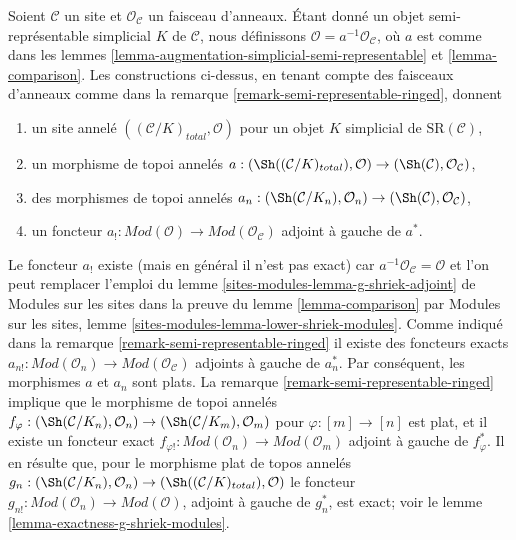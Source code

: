 \begin{remark}
\label{remark-augmentation-ringed}
Soient $\mathcal{C}$ un site et $\mathcal{O}_\mathcal{C}$ un faisceau d'anneaux.
Étant donné un objet semi-représentable simplicial $K$ de $\mathcal{C}$,
nous définissons $\mathcal{O} = a^{-1}\mathcal{O}_\mathcal{C}$, où $a$
est comme dans les lemmes \ref{lemma-augmentation-simplicial-semi-representable} et
\ref{lemma-comparison}.
Les constructions ci-dessus, en tenant compte des faisceaux d'anneaux
comme dans la remarque \ref{remark-semi-representable-ringed}, donnent
\begin{enumerate}
\item un site annelé $((\mathcal{C}/K)_{total}, \mathcal{O})$
pour un objet $K$ simplicial de $\text{SR}(\mathcal{C})$,
\item un morphisme de topoi annelés
$a : (\Sh((\mathcal{C}/K)_{total}), \mathcal{O}) \to
(\Sh(\mathcal{C}), \mathcal{O}_\mathcal{C})$,
\item des morphismes de topoi annelés
$a_n : (\Sh(\mathcal{C}/K_n), \mathcal{O}_n) \to
(\Sh(\mathcal{C}), \mathcal{O}_\mathcal{C})$,
\item un foncteur
$a_! : \textit{Mod}(\mathcal{O}) \to \textit{Mod}(\mathcal{O}_\mathcal{C})$
adjoint à gauche de $a^*$.
\end{enumerate}
Le foncteur $a_!$ existe (mais en général il n'est pas exact)
car $a^{-1}\mathcal{O}_\mathcal{C} = \mathcal{O}$
et l'on peut remplacer l'emploi du
lemme \ref{sites-modules-lemma-g-shriek-adjoint} de Modules sur les sites
dans la preuve du lemme \ref{lemma-comparison}
par Modules sur les sites, lemme \ref{sites-modules-lemma-lower-shriek-modules}.
Comme indiqué dans la remarque \ref{remark-semi-representable-ringed}
il existe des foncteurs exacts
$a_{n!} : \textit{Mod}(\mathcal{O}_n) \to
\textit{Mod}(\mathcal{O}_\mathcal{C})$
adjoints à gauche de $a_n^*$. Par conséquent, les morphismes $a$ et $a_n$ sont plats.
La remarque \ref{remark-semi-representable-ringed}
implique que le morphisme de topoi annelés
$f_\varphi : (\Sh(\mathcal{C}/K_n), \mathcal{O}_n) \to
(\Sh(\mathcal{C}/K_m), \mathcal{O}_m)$
pour $\varphi : [m] \to [n]$ est plat, et il existe un foncteur exact
$f_{\varphi !} : \textit{Mod}(\mathcal{O}_n) \to \textit{Mod}(\mathcal{O}_m)$
adjoint à gauche de $f_\varphi^*$. Il en résulte que, pour
le morphisme plat de topos annelés
$g_n : (\Sh(\mathcal{C}/K_n), \mathcal{O}_n) \to
(\Sh((\mathcal{C}/K)_{total}), \mathcal{O})$
le foncteur $g_{n!} : \textit{Mod}(\mathcal{O}_n) \to
\textit{Mod}(\mathcal{O})$, adjoint à gauche de $g_n^*$, est exact; voir
le lemme \ref{lemma-exactness-g-shriek-modules}.
\end{remark}

